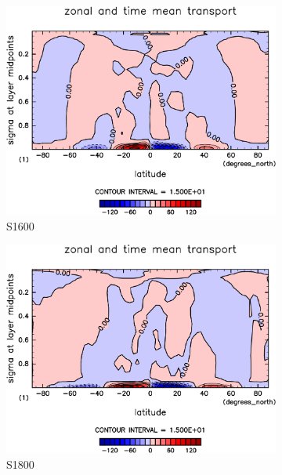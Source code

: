 \documentclass[body]{subfiles}
\begin{document}
\begin{figure}[t]
\begin{subfigure}{.4\textwidth}
		\centering
		\includegraphics[width=\textwidth]{S1600/MeriHeatTransTest@latentEn_M,time=3650:4015-crop-rotate.pdf}
		\caption{S1600}\label{潜熱平均子午面循環S1600}
	\end{subfigure}
	\begin{subfigure}{.4\textwidth}
		\centering
		\includegraphics[width=\textwidth]{S1800/MeriHeatTransTest@latentEn_M,time=3650:4015-crop-rotate.pdf}
		\caption{S1800}\label{潜熱平均子午面循環S1800}
	\end{subfigure}
	\begin{subfigure}{.4\textwidth}
		\centering

\end{subfigure}
\end{figure}
\end{document}
